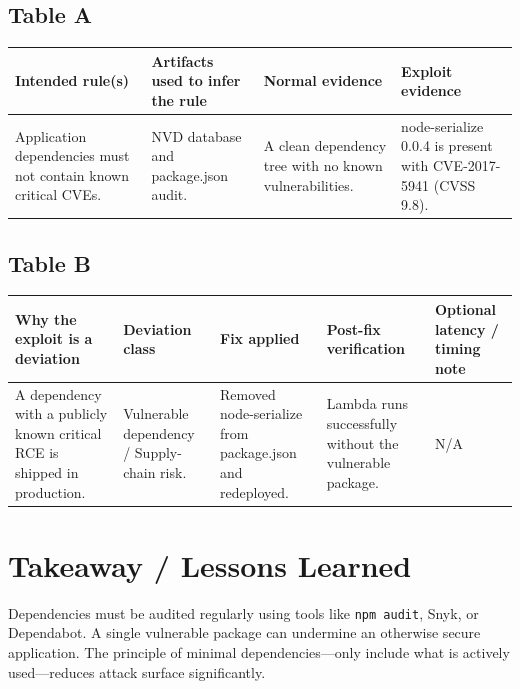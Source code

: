 \documentclass[12pt]{report}
\begin{document}
\subsection*{Table A}
\begin{table}[H]
  \small
  \centering
  \begin{tabularx}{\textwidth}{|Y|Y|Y|Y|}
    \hline
    \textbf{Intended rule(s)} & \textbf{Artifacts used to infer the rule} & \textbf{Normal evidence} & \textbf{Exploit evidence} \\
    \hline
    Application dependencies must not contain known critical CVEs. &
    NVD database and package.json audit. &
    A clean dependency tree with no known vulnerabilities. &
    node-serialize 0.0.4 is present with CVE-2017-5941 (CVSS 9.8). \\
    \hline
  \end{tabularx}
\end{table}

\subsection*{Table B}
\begin{table}[H]
  \footnotesize
  \centering
  \begin{tabularx}{\textwidth}{|Y|Y|Y|Y|Y|}
    \hline
    \textbf{Why the exploit is a deviation} & \textbf{Deviation class} & \textbf{Fix applied} & \textbf{Post-fix verification} & \textbf{Optional latency / timing note} \\
    \hline
    A dependency with a publicly known critical RCE is shipped in production. &
    Vulnerable dependency / Supply-chain risk. &
    Removed node-serialize from package.json and redeployed. &
    Lambda runs successfully without the vulnerable package. &
    N/A \\
    \hline
  \end{tabularx}
\end{table}

\section{Takeaway / Lessons Learned}
Dependencies must be audited regularly using tools like \texttt{npm audit}, Snyk, or Dependabot. A single vulnerable package can undermine an otherwise secure application. The principle of minimal dependencies---only include what is actively used---reduces attack surface significantly.

\clearpage
\end{document}

